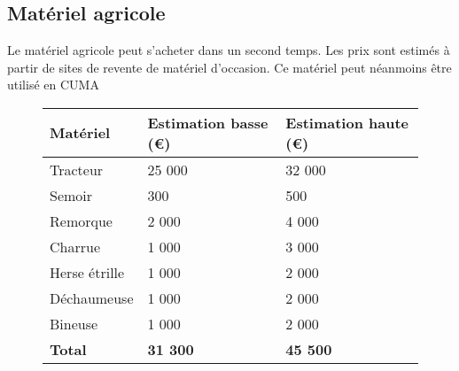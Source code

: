 \documentclass{article}
\begin{document}
\subsection{Matériel agricole}

Le matériel agricole peut s'acheter dans un second temps. Les prix sont estimés à partir de sites de revente de matériel d'occasion. Ce matériel peut néanmoins être utilisé en CUMA

\begin{figure}[h!]
\begin{center}
\begin{tabular}{|p{4cm}|p{3.5cm}|p{3.5cm}|}
\hline
 Matériel & Estimation basse (\euro{}) & Estimation haute (\euro{})\\
\hline
Tracteur &\hfill 25 000 & \hfill 32 000 \\
Semoir &  \hfill 300 &  \hfill 500 \\
Remorque & \hfill 2 000 & \hfill 4 000 \\
Charrue & \hfill 1 000 & \hfill 3 000 \\
Herse étrille & \hfill 1 000 & \hfill 2 000 \\
Déchaumeuse & \hfill 1 000 & \hfill 2 000 \\
Bineuse & \hfill 1 000 & \hfill 2 000 \\
\hline
\textbf{Total} & \hfill \textbf{31 300} & \hfill \textbf{45 500}
\\
\hline
\end{tabular}
\end{center}
\label{sejour_semaine}
\end{figure}
\end{document}

